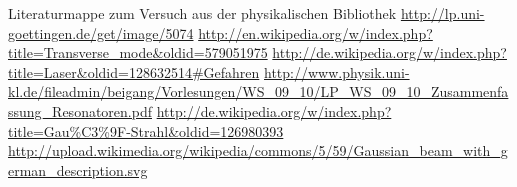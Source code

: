 \documentclass[bigchapter,colorback,accentcolor=tud4b,linedtoc,11pt]{tudreport}
\numberwithin{equation}{subsection}
\begin{document}
\cleardoublepage{}
\newpage
\begin{thebibliography}{100}
   Literaturmappe zum Versuch aus der physikalischen Bibliothek
   \url{http://lp.uni-goettingen.de/get/image/5074}
   \url{http://en.wikipedia.org/w/index.php?title=Transverse_mode&oldid=579051975}
   \url{http://de.wikipedia.org/w/index.php?title=Laser&oldid=128632514#Gefahren}
   \url{http://www.physik.uni-kl.de/fileadmin/beigang/Vorlesungen/WS_09_10/LP_WS_09_10_Zusammenfassung_Resonatoren.pdf}
   \url{http://de.wikipedia.org/w/index.php?title=Gau\%C3\%9F-Strahl&oldid=126980393}
   \url{http://upload.wikimedia.org/wikipedia/commons/5/59/Gaussian_beam_with_german_description.svg}
\end{thebibliography}

\cleardoublepage{}
\end{document}
